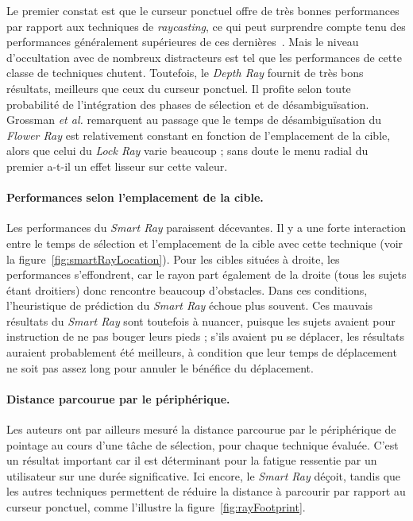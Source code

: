	Le premier constat est que le curseur ponctuel offre de très bonnes performances par rapport aux techniques de \emph{raycasting}, ce qui peut surprendre compte tenu des performances généralement supérieures de ces dernières~\cite{bowman2001testbed}. Mais le niveau d'occultation avec de nombreux distracteurs est tel que les performances de cette classe de techniques chutent. Toutefois, le \emph{Depth Ray} fournit de très bons résultats, meilleurs que ceux du curseur ponctuel. Il profite selon toute probabilité de l'intégration des phases de sélection et de désambiguïsation. Grossman \emph{et al.} remarquent au passage que le temps de désambiguïsation du \emph{Flower Ray} est relativement constant en fonction de l'emplacement de la cible, alors que celui du \emph{Lock Ray} varie beaucoup ; sans doute le menu radial du premier a-t-il un effet lisseur sur cette valeur.

	\paragraph{Performances selon l'emplacement de la cible.}
	Les performances du \emph{Smart Ray} paraissent décevantes. Il y a une forte interaction entre le temps de sélection et l'emplacement de la cible avec cette technique (voir la figure~\ref{fig:smartRayLocation}). Pour les cibles situées à droite, les performances s'effondrent, car le rayon part également de la droite (tous les sujets étant droitiers) donc rencontre beaucoup d'obstacles. Dans ces conditions, l'heuristique de prédiction du \emph{Smart Ray} échoue plus souvent. Ces mauvais résultats du \emph{Smart Ray} sont toutefois à nuancer, puisque les sujets avaient pour instruction de ne pas bouger leurs pieds ; s'ils avaient pu se déplacer, les résultats auraient probablement été meilleurs, à condition que leur temps de déplacement ne soit pas assez long pour annuler le bénéfice du déplacement.
	
	\paragraph{Distance parcourue par le périphérique.}
	Les auteurs ont par ailleurs mesuré la distance parcourue par le périphérique de pointage au cours d'une tâche de sélection, pour chaque technique évaluée. C'est un résultat important car il est déterminant pour la fatigue ressentie par un utilisateur sur une durée significative. Ici encore, le \emph{Smart Ray} déçoit, tandis que les autres techniques permettent de réduire la distance à parcourir par rapport au curseur ponctuel, comme l'illustre la figure~\ref{fig:rayFootprint}.	
	
